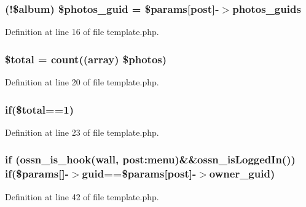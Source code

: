\subsubsection[{\texorpdfstring{\$photos\+\_\+guid}{$photos_guid}}]{ (!\$album) \$photos\+\_\+guid = \$params\mbox{[}\textquotesingle{}post\textquotesingle{}\mbox{]}-\/$>$photos\+\_\+guids}\hypertarget{template_8php_ac5b889be5aaba96358f3eb8ac72c21bf}{}\label{template_8php_ac5b889be5aaba96358f3eb8ac72c21bf}


Definition at line 16 of file template.\+php.

\subsubsection[{\texorpdfstring{\$total}{$total}}]{\setlength{\rightskip}{0pt plus 5cm}\$total = {\bf count}((array) \$photos)}\hypertarget{template_8php_a241b818f48030b628685b2e5119c5624}{}\label{template_8php_a241b818f48030b628685b2e5119c5624}


Definition at line 20 of file template.\+php.

\subsubsection[{\texorpdfstring{if}{if}}]{\setlength{\rightskip}{0pt plus 5cm}if(\$total==1)}\hypertarget{template_8php_adc75a6541acf09bfbf09a8105cd84624}{}\label{template_8php_adc75a6541acf09bfbf09a8105cd84624}


Definition at line 23 of file template.\+php.

\subsubsection[{\texorpdfstring{if}{if}}]{\setlength{\rightskip}{0pt plus 5cm}if ({\bf ossn\+\_\+is\+\_\+hook}(\textquotesingle{}wall\textquotesingle{}, \textquotesingle{}post\+:menu\textquotesingle{})\&\&ossn\+\_\+is\+Logged\+In()) if(\$params\mbox{[}\textquotesingle{}\mbox{]}-\/$>$guid==\$params\mbox{[}\textquotesingle{}post\textquotesingle{}\mbox{]}-\/$>${\bf owner\+\_\+guid})}\hypertarget{template_8php_a01283bd6df56fa280ea988dfb8dbbfaf}{}\label{template_8php_a01283bd6df56fa280ea988dfb8dbbfaf}


Definition at line 42 of file template.\+php.


